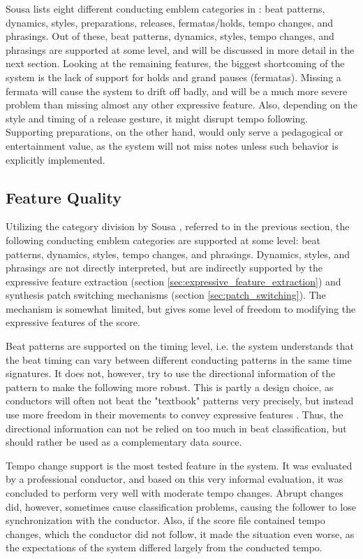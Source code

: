 Sousa lists eight different
conducting emblem categories in \cite{sousa1988}:
beat patterns, dynamics, styles,
preparations, releases, fermatas/holds,
tempo changes, and phrasings.
Out of these,
beat patterns, dynamics, styles,
tempo changes, and phrasings are supported at some level,
and will be discussed in more detail in
the next section. %
Looking at the remaining features,
the biggest shortcoming of the system
is the lack of support for
holds and grand pauses (fermatas).
Missing a fermata will cause the system
to drift off badly,
and will be a much more severe problem
than missing almost any other expressive feature.
Also, depending on the style and timing of a release gesture,
it might disrupt tempo following.
Supporting preparations, on the other hand,
would only serve a pedagogical or entertainment value,
as the system will not miss notes
unless such behavior is explicitly implemented.


\subsection{Feature Quality}
\label{sec:feature_quality}

Utilizing the category division by Sousa \cite{sousa1988},
referred to in the previous section,
the following conducting emblem categories are
supported at some level:
beat patterns, dynamics, styles,
tempo changes, and phrasings.
Dynamics, styles, and phrasings
are not directly interpreted,
but are indirectly supported by the
expressive feature extraction
(section \ref{sec:expressive_feature_extraction})
and synthesis patch switching mechanisms
(section \ref{sec:patch_switching}).
The mechanism is somewhat limited,
but gives some level of freedom to modifying
the expressive features of the score.

Beat patterns are supported on the timing level,
i.e. the system understands that the beat timing
can vary between different conducting patterns
in the same time signatures.
It does not, however,
try to use the directional information of the pattern
to make the following more robust.
This is partly a design choice,
as conductors will often not beat
the "textbook" patterns very precisely,
but instead use more freedom in their movements
to convey expressive features \cite{try to find a cite}.
Thus, the directional information
can not be relied on too much
in beat classification,
but should rather be used as a complementary data source.

Tempo change support is the most tested feature in the system.
It was evaluated by a professional conductor,
and based on this very informal evaluation,
it was concluded to perform very well with
moderate tempo changes.
Abrupt changes did, however,
sometimes cause classification problems,
causing the follower to lose synchronization with the conductor.
Also, if the score file contained tempo changes,
which the conductor did not follow,
it made the situation even worse,
as the expectations of the system differed
largely from the conducted tempo.

